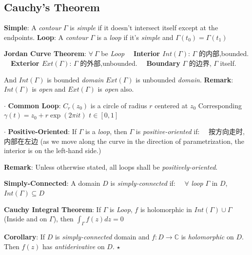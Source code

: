 \documentclass[9pt]{article}
\begin{document}
\subsection{Cauchy's Theorem} %

\textbf{Simple}: {\small A \textit{contour} $\Gamma$ is \textit{simple} if it doesn't intersect itself except at the endpoints.} \quad \textbf{Loop}: {\small A \textit{contour} $\Gamma$ is a \textit{loop} if it's \textit{simple} and $\Gamma(t_0)=\Gamma(t_1)$}

\textbf{Jordan Curve Theorem}: {\small $\forall \ \Gamma$ be \textit{Loop} \ \ \textbf{Interior $Int(\Gamma)$}: {\footnotesize $\Gamma$ 的内部,bounded.} \ \ \textbf{Exterior $Ext(\Gamma)$}: {\footnotesize $\Gamma$ 的外部,unbounded.} \ \ \textbf{Boundary} {\footnotesize $\Gamma$ 的边界, $\Gamma$ itself.}}

\quad And $Int(\Gamma)$ is bounded \textit{domain} \quad $Ext(\Gamma)$ is unbounded \textit{domain}. \quad \textbf{Remark}: $Int(\Gamma)$ is \textit{open} and $Ext(\Gamma)$ is \textit{open} also.

$\cdot$ \textbf{Common Loop}: $C_r(z_0)$ is a circle of radius $r$ centered at $z_0$ \quad Corresponding $\gamma(t)=z_0+r\exp(2\pi i t)$ $t\in[0,1]$

$\cdot$ \textbf{Positive-Oriented}: {\small If $\Gamma$ is a \textit{loop}, then $\Gamma$ is \textit{positive-oriented} if:} \ \ {\scriptsize 按方向走时,内部在左边} {\tiny (as we move along the curve in the direction of parametrization, the interior is on the left-hand side.)}

\quad \textbf{Remark}: Unless otherwise stated, all loops shall be \textit{positively-oriented}.

\textbf{Simply-Connected}: A domain $D$ is \textit{simply-connected} if: \ \ $\forall$ \textit{loop} $\Gamma$ in $D$, $Int(\Gamma)\subseteq D$ 

\textbf{Cauchy Integral Theorem}: If $\Gamma$ is \textit{Loop}, $f$ is holomorphic in $Int(\Gamma)\cup \Gamma$ {\scriptsize (Inside and on $\Gamma$)}, then $\int_{\Gamma}f(z)dz=0$

\quad \textbf{Corollary}: If $D$ is \textit{simply-connected} domain and $f:D\to\mathbb{C}$ is \textit{holomorphic} on $D$. Then $f(z)$ has \textit{antiderivative} on $D$. $\star$ 

\qquad\qquad{}
\end{document}
